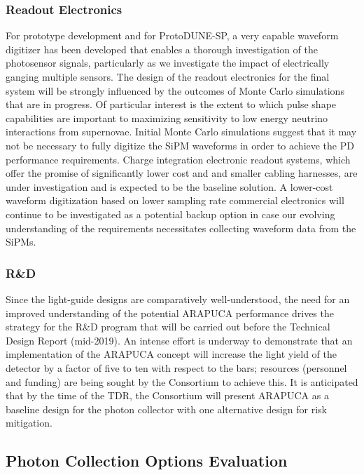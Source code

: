\subsubsection{Readout Electronics} 
For prototype development and for ProtoDUNE-SP, a very capable waveform digitizer has been developed that enables a thorough investigation of the photosensor signals, particularly as we investigate the impact of electrically ganging multiple sensors. The design of the readout electronics for the final system will be strongly influenced by the outcomes of Monte Carlo simulations that are in progress. Of particular interest is the extent to which pulse  shape capabilities are important to maximizing sensitivity to low energy neutrino interactions from supernovae. 
Initial Monte Carlo simulations suggest that it may not be necessary to fully digitize the SiPM waveforms in order to achieve the PD performance requirements.  Charge integration electronic readout systems, which offer the promise of significantly lower cost and and smaller cabling harnesses, are under investigation and is expected to be the baseline solution.
A lower-cost waveform digitization based on lower sampling rate commercial electronics will continue to be investigated as a potential backup option in case our evolving understanding of the requirements necessitates collecting waveform data from the SiPMs.

\subsubsection{R\&D} 
Since the light-guide designs are comparatively well-understood, the need for an improved understanding of the potential ARAPUCA performance drives the strategy for the R\&D program that will be carried out before the Technical Design Report (mid-2019). 
An intense effort is underway to demonstrate that an implementation of the ARAPUCA concept will increase the light yield of the detector by a factor of five to ten with respect to the bars; resources (personnel and funding)  are being sought by the Consortium to achieve this.  
It is anticipated that by the time of the TDR, the Consortium will present ARAPUCA as a baseline design for the photon collector with one alternative design for risk mitigation.  


\subsection{Photon Collection Options Evaluation}

